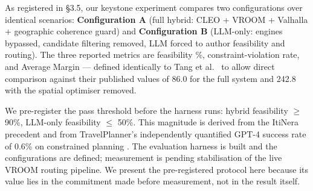 As registered in §3.5, our keystone experiment compares two configurations over identical
scenarios: \textbf{Configuration A} (full hybrid: CLEO + VROOM + Valhalla + geographic
coherence guard) and \textbf{Configuration B} (LLM-only: engines bypassed, candidate
filtering removed, LLM forced to author feasibility and routing). The three reported metrics are
feasibility \%, constraint-violation rate, and Average Margin — defined identically to Tang et al.\
\cite{itinera_tang_2024} to allow direct comparison against their published values of 86.0 for
the full system and 242.8 with the spatial optimiser removed.

We pre-register the pass threshold before the harness runs: hybrid feasibility $\geq$ 90\%,
LLM-only feasibility $\leq$ 50\%. This magnitude is derived from the ItiNera precedent
\cite[Table~2, p.~6]{itinera_tang_2024} and from TravelPlanner's independently quantified
GPT-4 success rate of 0.6\% on constrained planning \cite{travelplanner}. The evaluation
harness is built and the configurations are defined; measurement is pending stabilisation of the
live VROOM routing pipeline. We present the pre-registered protocol here because its value
lies in the commitment made before measurement, not in the result itself.
